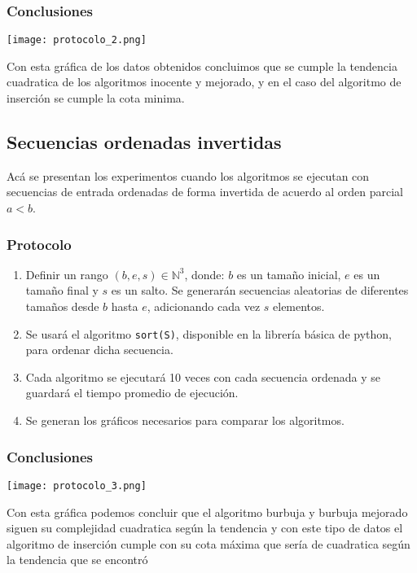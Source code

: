 \documentclass[letter]{article}
\begin{document}
\subsubsection{Conclusiones}
\texttt{[image: protocolo\_2.png]}

Con esta gráfica de los datos obtenidos concluimos que se cumple la tendencia cuadratica de los algoritmos inocente y mejorado, y en el caso del algoritmo de inserción se cumple la cota minima.
\subsection{Secuencias ordenadas invertidas} \label{experimentos:invertidas}

Acá se presentan los experimentos cuando los algoritmos se ejecutan con secuencias de entrada ordenadas de forma invertida de acuerdo al orden parcial $a<b$.

\subsubsection{Protocolo}
\begin{enumerate}
    \item Definir un rango $(b,e,s)\in\mathbb{N}^3$, donde: $b$ es un tamaño inicial, $e$ es un tamaño final y $s$ es un salto. Se generarán secuencias aleatorias de diferentes tamaños desde $b$ hasta $e$, adicionando cada vez $s$ elementos.
    \item Se usará el algoritmo \texttt{sort(S)}, disponible en la librería básica de python, para ordenar dicha secuencia.
    \item Cada algoritmo se ejecutará 10 veces con cada secuencia ordenada y se guardará el tiempo promedio de ejecución.
    \item Se generan los gráficos necesarios para comparar los algoritmos.
\end{enumerate}

\subsubsection{Conclusiones}
\texttt{[image: protocolo\_3.png]}

Con esta gráfica podemos concluir que el algoritmo burbuja y burbuja mejorado siguen su complejidad cuadratica según la tendencia y con este tipo de datos el algoritmo de inserción cumple con su cota máxima que sería de cuadratica según la tendencia que se encontró 
\end{document}
